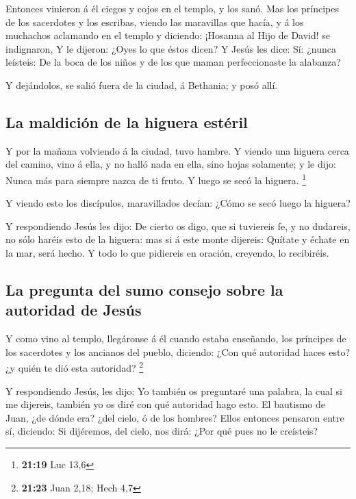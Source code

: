  Entonces vinieron á él ciegos y cojos en el templo, y los
sanó.  Mas los príncipes de los sacerdotes y los escribas,
viendo las maravillas que hacía, y á los muchachos aclamando en el
templo y diciendo: ¡Hosanna al Hijo de David! se indignaron,
 Y le dijeron: ¿Oyes lo que éstos dicen? Y Jesús les dice:
Sí: ¿nunca leísteis: De la boca de los niños y de los que maman
perfeccionaste la alabanza?

 Y dejándolos, se salió fuera de la ciudad, á Bethania; y
posó allí.

\hypertarget{la-maldiciuxf3n-de-la-higuera-estuxe9ril}{%
\subsection{La maldición de la higuera
estéril}\label{la-maldiciuxf3n-de-la-higuera-estuxe9ril}}

 Y por la mañana volviendo á la ciudad, tuvo hambre.
 Y viendo una higuera cerca del camino, vino á ella, y no
halló nada en ella, sino hojas solamente; y le dijo: Nunca más para
siempre nazca de ti fruto. Y luego se secó la higuera. \footnote{\textbf{21:19}
  Luc 13,6}

 Y viendo esto los discípulos, maravillados decían: ¿Cómo
se secó luego la higuera?

 Y respondiendo Jesús les dijo: De cierto os digo, que si
tuviereis fe, y no dudareis, no sólo haréis esto de la higuera: mas si á
este monte dijereis: Quítate y échate en la mar, será hecho.
 Y todo lo que pidiereis en oración, creyendo, lo
recibiréis.

\hypertarget{la-pregunta-del-sumo-consejo-sobre-la-autoridad-de-jesuxfas}{%
\subsection{La pregunta del sumo consejo sobre la autoridad de
Jesús}\label{la-pregunta-del-sumo-consejo-sobre-la-autoridad-de-jesuxfas}}

 Y como vino al templo, llegáronse á él cuando estaba
enseñando, los príncipes de los sacerdotes y los ancianos del pueblo,
diciendo: ¿Con qué autoridad haces esto? ¿y quién te dió esta autoridad?
\footnote{\textbf{21:23} Juan 2,18; Hech 4,7}

 Y respondiendo Jesús, les dijo: Yo también os preguntaré
una palabra, la cual si me dijereis, también yo os diré con qué
autoridad hago esto.  El bautismo de Juan, ¿de dónde era?
¿del cielo, ó de los hombres? Ellos entonces pensaron entre sí,
diciendo: Si dijéremos, del cielo, nos dirá: ¿Por qué pues no le
creísteis?

